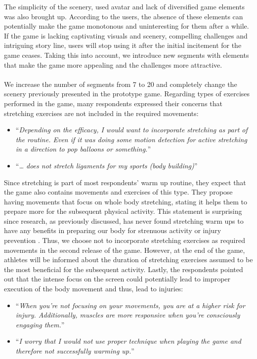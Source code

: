 The simplicity of the scenery, used avatar and lack of diversified game elements was also brought up. According to the users, the absence of these elements can potentially make the game monotonous and uninteresting for them after a while. If the game is lacking captivating visuals and scenery, compelling challenges and intriguing story line, users will stop using it after the initial incitement for the game ceases. Taking this into account, we introduce new segments with elements that make the game more appealing and the challenges more attractive. \\\\We increase the number of segments from 7 to 20 and completely change the scenery previously presented in the prototype game. Regarding types of exercises performed in the game, many respondents expressed their concerns that stretching exercises are not included in the required movements: 
\begin{itemize}
\item ``\textit{Depending on the efficacy, I would want to incorporate stretching as part of the routine. Even if it was doing some motion detection for active stretching in a direction to pop balloons or something.}''
\item ``\textit{… does not stretch ligaments for my sports (body building)}''
\end{itemize}
Since stretching is part of most respondents' warm up routine, they expect that the game also contains movements and exercises of this type. They propose having movements that focus on whole body stretching, stating it helps them to prepare more for the subsequent physical activity. This statement is surprising since research, as previously discussed,  has never found stretching warm ups to have any benefits in preparing our body for strenuous activity or injury prevention \cite{pereles2012large}. Thus, we choose not to incorporate stretching exercises as required movements in the second release of the game. However, at the end of the game, athletes will be informed about the duration of stretching exercises assumed to be the most beneficial for the subsequent activity. Lastly, the respondents pointed out that the intense focus on the screen could potentially lead to improper execution of the body movement and thus, lead to injuries:
\begin{itemize}
\item ``\textit{When you're not focusing on your movements, you are at a higher risk for injury. Additionally, muscles are more responsive when you're consciously engaging them.}''
\item ``\textit{I worry that I would not use proper technique when playing the game and therefore not successfully warming up.}''
\end{itemize}
